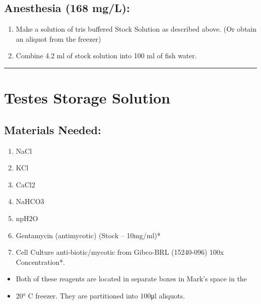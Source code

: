 \documentclass[
]{book}
\providecommand{\tightlist}{%
  \setlength{\itemsep}{0pt}\setlength{\parskip}{0pt}}
\begin{document}
\hypertarget{anesthesia-168-mgl-1}{%
\subsection{Anesthesia (168 mg/L):}\label{anesthesia-168-mgl-1}}

\begin{enumerate}
\def\labelenumi{\arabic{enumi}.}
\tightlist
\item
  Make a solution of tris buffered Stock Solution as described above. (Or obtain an aliquot from the freezer)
\item
  Combine 4.2 ml of stock solution into 100 ml of fish water.
\end{enumerate}

\begin{center}\rule{0.5\linewidth}{0.5pt}\end{center}

\hypertarget{testes-storage-solution}{%
\section{Testes Storage Solution}\label{testes-storage-solution}}

\hypertarget{materials-needed-4}{%
\subsection{Materials Needed:}\label{materials-needed-4}}

\begin{enumerate}
\def\labelenumi{\arabic{enumi}.}
\tightlist
\item
  NaCl
\item
  KCl
\item
  CaCl2
\item
  NaHCO3
\item
  npH2O
\item
  Gentamycin (antimycotic) (Stock -- 10mg/ml)*
\item
  Cell Culture anti-biotic/mycotic from Gibco-BRL (15240-096) 100x Concentration*.
\end{enumerate}

\begin{itemize}
\tightlist
\item
  Both of these reagents are located in separate boxes in Mark's space in the
\item
  20° C freezer. They are partitioned into 100μl aliquots.
\end{itemize}
\end{document}
